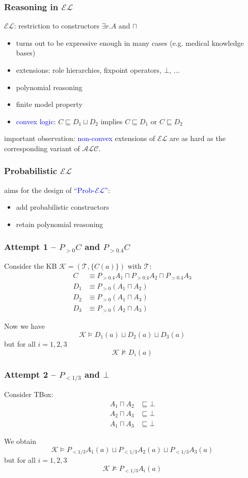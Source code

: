 \documentclass[draft]{beamer}
\newcommand{\el}{\ensuremath{\mathcal{EL}}\xspace}
\newcommand{\alc}{\ensuremath{\mathcal{ALC}}\xspace}
\newcommand{\exptime}{\ensuremath{\textsc{ExpTime}}\xspace}
\renewcommand{\emph}[1]{\textcolor{blue}{#1}}
\begin{document}
\begin{frame}
  \frametitle{Reasoning in \el}
  \el: restriction to constructors $\exists r.A$ and $\sqcap$
  \begin{itemize}
    \item turns out to be expressive enough in many cases (\mbox{e.g.} medical knowledge bases)
    \item extensions: role hierarchies, fixpoint operators, $\bot$, $\dots$
    \item polynomial reasoning
    \item finite model property 
    \item \emph{convex logic}: $C\sqsubseteq D_1\sqcup D_2$ implies $C\sqsubseteq D_1$ or $C\sqsubseteq D_2$
  \end{itemize}
  important observation: \emph{non-convex} extensions of \el are as hard as the corresponding variant of \alc.
\end{frame}


\begin{frame}
  \frametitle{Probabilistic \el}
  aims for the design of \emph{``Prob-\el''}:
  \begin{itemize}
    \item add probabilistic constructors
    \item retain polynomial reasoning
  \end{itemize}

\end{frame}

\begin{frame}
  \frametitle{Attempt 1 -- $P_{>0}C$ and $P_{>0.4}C$}

  Consider the KB $\mathcal K=(\mathcal T, \{C(a)\})$ with $\mathcal T$: 
  \begin{align*}
    C &\equiv P_{>0.4}A_1\sqcap P_{>0.4}A_2\sqcap P_{>0.4}A_3 \\
    D_1 &\equiv P_{>0}(A_1\sqcap A_2) \\
    D_2 &\equiv P_{>0}(A_1\sqcap A_3) \\
    D_3 &\equiv P_{>0}(A_2\sqcap A_3)
  \end{align*}

  \pause
  Now we have $$\mathcal K\models D_1(a)\sqcup D_2(a)\sqcup D_3(a)$$ but for all $i=1,2,3$ $$\mathcal K\not\models D_i(a)$$
\end{frame}


\begin{frame}
  \frametitle{Attempt 2 -- $P_{<1/3}$ and $\bot$}

  Consider TBox: 
  \begin{align*}
    A_1\sqcap A_2 &\sqsubseteq\bot \\
    A_2\sqcap A_3 &\sqsubseteq\bot \\
    A_1\sqcap A_3 &\sqsubseteq\bot
  \end{align*}

  \pause
  We obtain 
  $$\mathcal K\models P_{<1/3}A_1(a)\sqcup P_{<1/3}A_2(a)\sqcup P_{<1/3}A_3(a)$$ but for all $i=1,2,3$ 
  $$\mathcal K\not\models P_{<1/3}A_i(a)$$
\end{frame}
\end{document}
